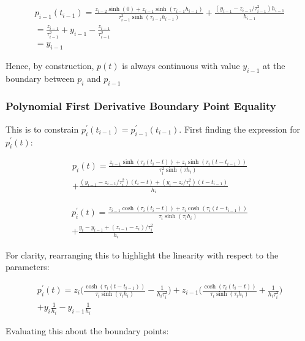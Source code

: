\documentclass{article}
\begin{document}
\begin{eqnarray}
    \nonumber
    p_{i-1}(t_{i-1}) = \frac{z_{i-2} \sinh(0) + z_{i-1} \sinh(\tau_{i-1} h_{i-1})}{\tau_{i-1}^2 \sinh(\tau_{i-1} h_{i-1})}
    + \frac{(y_{i-1} - z_{i-1}/\tau_{i-1}^2) h_{i-1}}{h_{i-1}} \\
    \nonumber
    = \frac{z_{i-1}}{\tau_{i-1}^2} + y_{i-1} - \frac{z_{i-1}}{\tau_{i-1}^2} \\
    \nonumber
    = y_{i-1}
\end{eqnarray}

Hence, by construction, $p(t)$ is always continuous with value $y_{i-1}$ at the boundary
between $p_i$ and $p_{i - 1}$

\subsubsection{Polynomial First Derivative Boundary Point Equality}
This is to constrain $p^\prime_i(t_{i-1}) = p^\prime_{i-1}(t_{i-1})$. First finding the 
expression for $p^\prime_i(t)$:

\begin{multline}
    p_i(t) = \frac{z_{i-1} \sinh(\tau_i (t_i - t)) + z_i \sinh(\tau_i (t - t_{i-1}))}{\tau_i^2 \sinh(\tau h_i)}  \\
        + \frac{(y_{i-1} - z_{i-1}/\tau_i^2)(t_i - t) + (y_i - z_i/\tau_i^2)(t - t_{i-1})}{h_i}
\end{multline}

\begin{multline}
    p^\prime_i(t) = \frac{ z_{i-1} \cosh(\tau_i (t_i - t)) + z_i \cosh(\tau_i (t - t_{i-1}))}{\tau_i \sinh(\tau_i h_i)}  \\
        + \frac{y_i - y_{i-1} +  (z_{i-1} - z_i)/\tau_i^2}{h_i}
\end{multline}

For clarity, rearranging this to highlight the linearity with respect to the parameters:

\begin{multline}
    p^\prime_i(t) = z_i \biggl( \frac{ \cosh(\tau_i (t - t_{i-1}))}{\tau_i \sinh(\tau_i h_i)} - \frac{1}{h_i \tau_i^2} \biggr) 
        + z_{i-1} \biggl( \frac{ \cosh(\tau_i (t_i - t))}{\tau_i \sinh(\tau_i h_i)} + \frac{1}{h_i \tau_i^2} \biggr)\\
        + y_i \frac{1}{h_i} - y_{i - 1} \frac{1}{h_i}
\end{multline}

Evaluating this about the boundary points:
\end{document}
